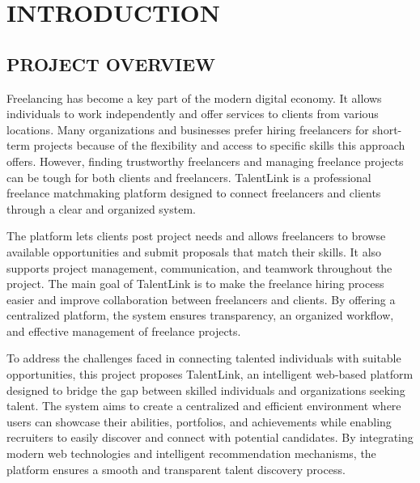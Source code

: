 \documentclass[12pt,a4paper,oneside]{report}
\numberwithin{figure}{chapter}
\numberwithin{table}{chapter}
\begin{document}
\newpage
{}
\setcounter{page}{1}

\chapter{INTRODUCTION}

\section{PROJECT OVERVIEW}

Freelancing has become a key part of the modern digital economy. It allows individuals
to work independently and offer services to clients from various locations. Many
organizations and businesses prefer hiring freelancers for short-term projects because of
the flexibility and access to specific skills this approach offers. However, finding
trustworthy freelancers and managing freelance projects can be tough for both clients and
freelancers. TalentLink is a professional freelance matchmaking platform designed to
connect freelancers and clients through a clear and organized system.

\indent The platform lets clients post project needs and allows freelancers to browse
available opportunities and submit proposals that match their skills. It also supports
project management, communication, and teamwork throughout the project. The main goal of
TalentLink is to make the freelance hiring process easier and improve collaboration
between freelancers and clients. By offering a centralized platform, the system ensures
transparency, an organized workflow, and effective management of freelance projects.

\indent To address the challenges faced in connecting talented individuals with suitable
opportunities, this project proposes TalentLink, an intelligent web-based platform
designed to bridge the gap between skilled individuals and organizations seeking talent.
The system aims to create a centralized and efficient environment where users can
showcase their abilities, portfolios, and achievements while enabling recruiters to
easily discover and connect with potential candidates. By integrating modern web
technologies and intelligent recommendation mechanisms, the platform ensures a smooth
and transparent talent discovery process.
\end{document}
